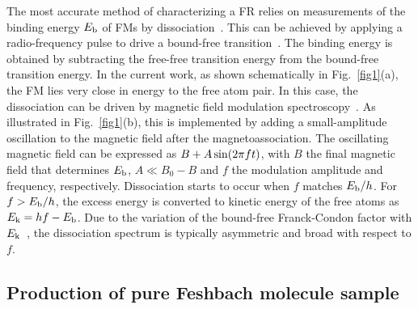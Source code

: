 The most accurate method of characterizing a FR relies on measurements of the binding energy $E_{\rm b}$ of FMs by dissociation~\cite{Bartenstein2005,Lompe2013,Chin2005Radio,Chapurin2019}. This can be achieved by applying a radio-frequency pulse to drive a bound-free transition~\cite{Bartenstein2005,Lompe2013,Chapurin2019}. The binding energy is obtained by subtracting the free-free transition energy from the bound-free transition energy. In the current work, as shown schematically in Fig.~\ref{fig1}(a), the FM lies very close in energy to the free atom pair. In this case, the dissociation can be driven by magnetic field modulation spectroscopy~\cite{Claussen2003,Thompson2005}. As illustrated in Fig.~\ref{fig1}(b), this is implemented by adding a small-amplitude oscillation to the magnetic field after the magnetoassociation. The oscillating magnetic field can be expressed as $B + A \, {\rm sin}(2\pi f t)$, with $B$ the final magnetic field that determines $E_{\rm b}$, $A\ll B_0-B $ and $f$ the modulation amplitude and frequency, respectively. Dissociation starts to occur when $f$ matches $E_{\rm b}/h$. For $f > E_{\rm b}/h$, the excess energy is converted to kinetic energy of the free atoms as $E_{\rm k} = hf - E_{\rm b}$. Due to the variation of the bound-free Franck-Condon factor with $E_{\rm k}$~\cite{Chin2005Radio}, the dissociation spectrum is typically asymmetric and broad with respect to $f$.

\subsection{Production of pure Feshbach molecule sample}

